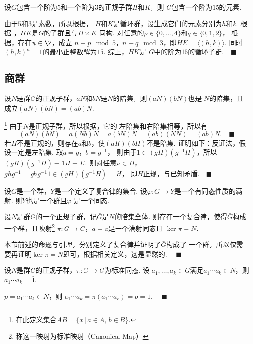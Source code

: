   \begin{exa}
    设$G$包含一个阶为$5$和一个阶为$3$的正规子群$H$和$K$，则
    $G$包含一个阶为$15$的元素.
  \end{exa}
  \proof
    由于$5$和$3$是素数，所以根据，
    $H$和$K$是循环群，设生成它们的元素分别为$h$和$k$. 根据
    ，$HK$是$G$的子群且与$H\times K$
    同构. 对任意的$p\in\{0,\dots,4\}$和$q\in\{0,1,2\}$，
    根据，存在$n\in\Z$，成立
    $n\equiv p \mod 5$，$n\equiv q\mod 3$，即$HK=\langle(h,k)
    \rangle$. 同时$(h,k)^n=1$的最小正整数解为$15$. 综上，$HK$是
    $G$中的阶为$15$的循环子群.$\quad\blacksquare$

\subsection{商群}

  \begin{pos}
    设$N$是群$G$的正规子群，$aN$和$bN$是$N$的陪集，则$(aN)(bN)$也是
    $N$的陪集，且成立$(aN)(bN) = (ab)N$.
  \end{pos}
  \proof
    \footnote{在此定义集合$AB=\{x\,|\, a\in A,\, b\in B\}$.}
    由于$N$是正规子群，所以根据，它的
    左陪集和右陪集相等，所以有
    \[
      (aN)(bN)=a(Nb)N=a(bN)N=(ab)(NN)=(ab)N.\quad\blacksquare
    \]
  \remark
    若$H$不是正规的，则存在$a$和$b$，使$(aH)(bH)$不是陪集.
    证明如下：反证法，假设一定是左陪集. 取$a=g$，$b=g^{-1}$，
    则由于$1\in (gH)(g^{-1}H)$，所以$(gH)(g^{-1}H) = 1H = H$.
    则对任意$h\in H$，$ghg^{-1} = ghg^{-1}1 \in (gH)(g^{-1}H) = H$，
    即$H$正规，与已知矛盾.$\quad\blacksquare$

  \begin{lemma}
    设$G$是一个群，$Y$是一个定义了复合律的集合. 设$\varphi:
    G\to Y$是一个有同态性质的满射. 则$Y$也是一个群且$\varphi$
    是一个同态.
  \end{lemma}

  \begin{thm}
    设$N$是群$G$的一个正规子群，记$\bar{G}$是$N$的陪集全体.
    则存在一个复合律，使得$\bar{G}$构成一个群，且映射\footnote{
    称这一映射为标准映射（Canonical Map）}
    $\pi:G\to\bar{G}$，$\bar{a}=\bar{a}$是一个满射同态且
    $\ker\pi=N$.
  \end{thm}
  \proof
    本节前述的命题与引理，分别定义了复合律并证明了$\bar{G}$构成了
    一个群，所以仅需要再证明$\ker\pi=N$即可，根据相关定义，这是显然的.
    $\quad\blacksquare$

  \begin{cor}
    设$N$是群$G$的正规子群，$\pi:G\to\bar{G}$为标准同态. 设
    $a_1,\dots,a_k\in G$满足$a_1\cdots a_k\in N$，则
    $\bar{a}_1\cdots\bar{a}_k=\bar{1}$.
  \end{cor}
  \proof
    $p=a_1\cdots a_k\in N$，则
    $\bar{a}_1\cdots\bar{a}_k=\pi(a_1\cdots a_k)=\bar{p}=\bar{1}$.
    $\quad\blacksquare$

